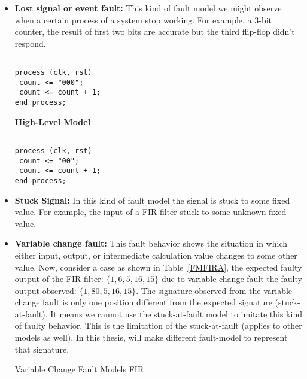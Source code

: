 
\label{appendix}
\begin{itemize}

\item \textbf{Lost signal or event fault:} This kind of fault model we might observe when a certain process of a system stop working. For example, a 3-bit counter, the result of first two bits are accurate but the third flip-flop didn't respond.


\begin{lstlisting}[frame=single]  % Start your code-block

process (clk, rst)
 count <= "000";
 count <= count + 1;
end process;
\end{lstlisting}

\textbf{High-Level Model}

\begin{lstlisting}[frame=single]  % Start your code-block

process (clk, rst)
 count <= "00";
 count <= count + 1;
end process;
\end{lstlisting}



\item \textbf{Stuck Signal:} In this kind of fault model the signal is stuck to some fixed value. For example, the input of a FIR filter stuck to some unknown fixed value. 

 

\item \textbf{Variable change fault:} This fault behavior shows the situation in which either input, output, or intermediate calculation value changes to some other value. Now, consider a case as shown in Table~\ref{FMFIRA}, the expected faulty output of the FIR filter: $\{1, 6, 5, 16, 15\}$ due to variable change fault the faulty output observed: $\{1, 80, 5, 16, 15\}$. The signature observed from the variable change fault is only one position different from the expected signature (stuck-at-fault).  It means we cannot use the stuck-at-fault model to imitate this kind of faulty behavior. This is  the limitation of the stuck-at-fault (applies to other models as well). In this thesis, will make different fault-model to represent that signature.


\begin{table}[tb!]
\center
\caption{Variable Change Fault Models FIR}


\end{table}
\end{itemize}
